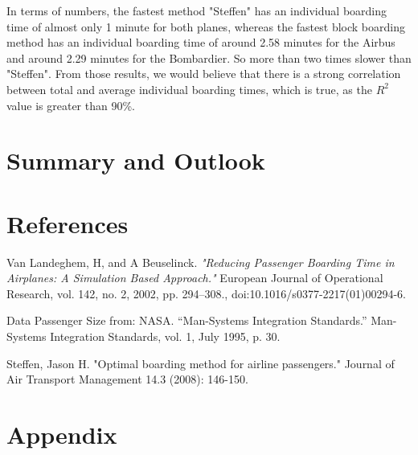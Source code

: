 \documentclass[11pt]{article}
\begin{document}
	In terms of numbers, the fastest method "Steffen" has an individual boarding time of almost only 1 minute for both planes, whereas the fastest block boarding method has an individual boarding time of around 2.58 minutes for the Airbus and around 2.29 minutes for the Bombardier. So more than two times slower than "Steffen". From those results, we would believe that there is a strong correlation between total and average individual boarding times, which is true, as the $R^2$ value is greater than 90\%.


\section{Summary and Outlook}

\section{References}
\begin{thebibliography}{9}
	Van Landeghem, H, and A Beuselinck. 
	\textit{"Reducing Passenger Boarding Time in Airplanes: A Simulation Based Approach."} 
	European Journal of Operational Research, vol. 142, no. 2, 2002, pp. 294–308.,
	doi:10.1016/s0377-2217(01)00294-6.
	
	Data Passenger Size from:  NASA. “Man-Systems Integration Standards.” Man-Systems Integration Standards, vol. 1, July 1995, p. 30.
	
	Steffen, Jason H. "Optimal boarding method for airline passengers." Journal of Air Transport Management 14.3 (2008): 146-150.
\end{thebibliography}




\section{Appendix}
\end{document}
